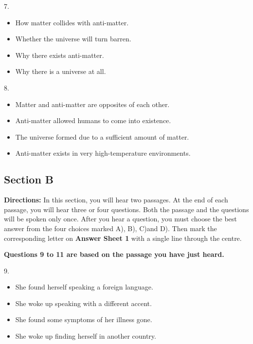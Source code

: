 \documentclass[UTF8,11pt]{ctexart}
\begin{document}
7.


\begin{itemize}[leftmargin=2em,itemsep=.2em,topsep=.4em]\item[A.] How matter collides with anti-matter.
\item[B.] Whether the universe will turn barren.
\item[C.] Why there exists anti-matter.
\item[D.] Why there is a universe at all.
\end{itemize}

8.


\begin{itemize}[leftmargin=2em,itemsep=.2em,topsep=.4em]\item[A.] Matter and anti-matter are opposites of each other.
\item[B.] Anti-matter allowed humans to come into existence.
\item[C.] The universe formed due to a sufficient amount of matter.
\item[D.] Anti-matter exists in very high-temperature environments.
\end{itemize}

\subsection*{\textbf{Section B}}


\textbf{Directions:} In this section, you will hear two passages. At the end of each passage, you will hear three or four questions. Both the passage and the questions will be spoken only once. After you hear a question, you must choose the best answer from the four choices marked A), B), C)and D). Then mark the corresponding letter on\textbf{ Answer Sheet 1} with a single line through the centre.


\textbf{Questions 9 to 11 are based on the passage you have just heard.}


9.


\begin{itemize}[leftmargin=2em,itemsep=.2em,topsep=.4em]\item[A.] She found herself speaking a foreign language.
\item[B.] She woke up speaking with a different accent.
\item[C.] She found some symptoms of her illness gone.
\item[D.] She woke up finding herself in another country.
\end{itemize}
\end{document}

